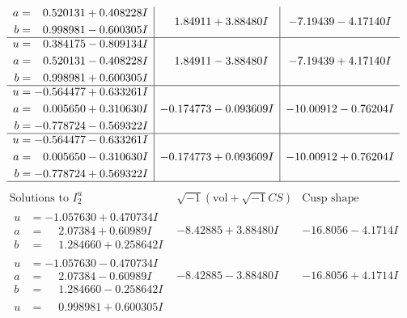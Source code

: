 \documentclass[1p]{elsarticle_modified}
\theoremstyle{definition}
\newcommand{\I}{\sqrt{-1}}
\begin{document}
$$\begin{array}{c|c|c}
\begin{aligned}
a &= \phantom{-}0.520131 + 0.408228 I \\
b &= \phantom{-}0.998981 - 0.600305 I\end{aligned}
 & \phantom{-}1.84911 + 3.88480 I & -7.19439 - 4.17140 I \\ \hline\begin{aligned}
u &= \phantom{-}0.384175 - 0.809134 I \\
a &= \phantom{-}0.520131 - 0.408228 I \\
b &= \phantom{-}0.998981 + 0.600305 I\end{aligned}
 & \phantom{-}1.84911 - 3.88480 I & -7.19439 + 4.17140 I \\ \hline\begin{aligned}
u &= -0.564477 + 0.633261 I \\
a &= \phantom{-}0.005650 + 0.310630 I \\
b &= -0.778724 - 0.569322 I\end{aligned}
 & -0.174773 - 0.093609 I & -10.00912 - 0.76204 I \\ \hline\begin{aligned}
u &= -0.564477 - 0.633261 I \\
a &= \phantom{-}0.005650 - 0.310630 I \\
b &= -0.778724 + 0.569322 I\end{aligned}
 & -0.174773 + 0.093609 I & -10.00912 + 0.76204 I\\
 \hline 
 \end{array}$$\newpage$$\begin{array}{c|c|c}  
\text{Solutions to }I^u_{2}& \I (\text{vol} + \sqrt{-1}CS) & \text{Cusp shape}\\
 \hline 
\begin{aligned}
u &= -1.057630 + 0.470734 I \\
a &= \phantom{-}2.07384 + 0.60989 I \\
b &= \phantom{-}1.284660 + 0.258642 I\end{aligned}
 & -8.42885 + 3.88480 I & -16.8056 - 4.1714 I \\ \hline\begin{aligned}
u &= -1.057630 - 0.470734 I \\
a &= \phantom{-}2.07384 - 0.60989 I \\
b &= \phantom{-}1.284660 - 0.258642 I\end{aligned}
 & -8.42885 - 3.88480 I & -16.8056 + 4.1714 I \\ \hline\begin{aligned}
u &= \phantom{-}0.998981 + 0.600305 I \\

\end{aligned}
\end{array}$$
\end{document}
